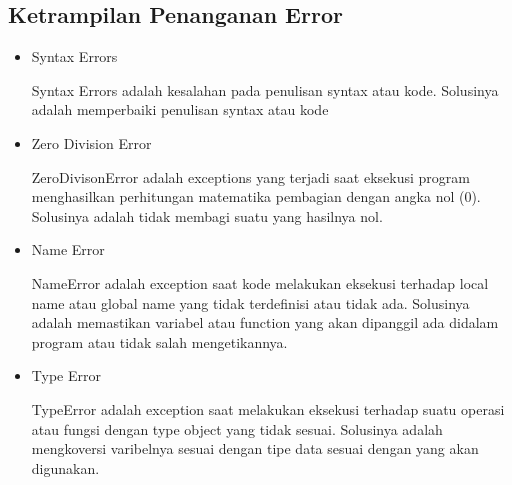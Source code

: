 \subsection{Ketrampilan Penanganan Error}
\begin{itemize}
\item Syntax Errors

Syntax Errors adalah kesalahan pada penulisan syntax atau kode. Solusinya adalah memperbaiki penulisan syntax atau kode

\item Zero Division Error

ZeroDivisonError adalah exceptions yang terjadi saat eksekusi program menghasilkan perhitungan matematika pembagian dengan angka nol (0). Solusinya adalah tidak membagi suatu yang hasilnya nol.

\item Name Error

NameError adalah exception saat kode melakukan eksekusi terhadap local name atau global name yang tidak terdefinisi atau tidak ada. Solusinya adalah memastikan variabel atau function yang akan dipanggil ada didalam program atau tidak salah mengetikannya.

\item Type Error

TypeError adalah exception saat melakukan eksekusi terhadap suatu operasi atau fungsi dengan type object yang tidak sesuai. Solusinya adalah mengkoversi varibelnya sesuai dengan tipe data sesuai dengan yang akan digunakan.
\end{itemize}
